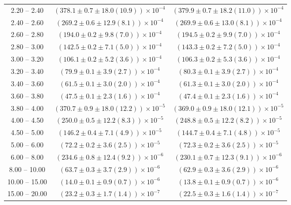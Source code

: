 \begin{table}
\begin{center}
\begin{tabular}{ c | c c }
2.20 -- 2.40 & $(378.1\pm0.7\pm18.0(10.9))\times10^{-4}$ & $(379.9\pm0.7\pm18.2(11.0))\times10^{-4}$ \\ 
2.40 -- 2.60 & $(269.2\pm0.6\pm12.9(8.1))\times10^{-4}$ & $(269.9\pm0.6\pm13.0(8.1))\times10^{-4}$ \\ 
2.60 -- 2.80 & $(194.0\pm0.2\pm9.8(7.0))\times10^{-4}$ & $(194.5\pm0.2\pm9.9(7.0))\times10^{-4}$ \\ 
2.80 -- 3.00 & $(142.5\pm0.2\pm7.1(5.0))\times10^{-4}$ & $(143.3\pm0.2\pm7.2(5.0))\times10^{-4}$ \\ 
3.00 -- 3.20 & $(106.1\pm0.2\pm5.2(3.6))\times10^{-4}$ & $(106.3\pm0.2\pm5.3(3.6))\times10^{-4}$ \\ 
3.20 -- 3.40 & $(79.9\pm0.1\pm3.9(2.7))\times10^{-4}$ & $(80.3\pm0.1\pm3.9(2.7))\times10^{-4}$ \\ 
3.40 -- 3.60 & $(61.5\pm0.1\pm3.0(2.0))\times10^{-4}$ & $(61.3\pm0.1\pm3.0(2.0))\times10^{-4}$ \\ 
3.60 -- 3.80 & $(47.5\pm0.1\pm2.3(1.6))\times10^{-4}$ & $(47.4\pm0.1\pm2.3(1.6))\times10^{-4}$ \\ 
3.80 -- 4.00 & $(370.7\pm0.9\pm18.0(12.2))\times10^{-5}$ & $(369.0\pm0.9\pm18.0(12.1))\times10^{-5}$ \\ 
4.00 -- 4.50 & $(250.0\pm0.5\pm12.2(8.3))\times10^{-5}$ & $(248.8\pm0.5\pm12.2(8.2))\times10^{-5}$ \\ 
4.50 -- 5.00 & $(146.2\pm0.4\pm7.1(4.9))\times10^{-5}$ & $(144.7\pm0.4\pm7.1(4.8))\times10^{-5}$ \\ 
5.00 -- 6.00 & $(72.2\pm0.2\pm3.6(2.5))\times10^{-5}$ & $(72.3\pm0.2\pm3.6(2.5))\times10^{-5}$ \\ 
6.00 -- 8.00 & $(234.6\pm0.8\pm12.4(9.2))\times10^{-6}$ & $(230.1\pm0.7\pm12.3(9.1))\times10^{-6}$ \\ 
8.00 -- 10.00 & $(63.7\pm0.3\pm3.7(2.9))\times10^{-6}$ & $(62.9\pm0.3\pm3.6(2.9))\times10^{-6}$ \\ 
10.00 -- 15.00 & $(14.0\pm0.1\pm0.9(0.7))\times10^{-6}$ & $(13.8\pm0.1\pm0.9(0.7))\times10^{-6}$ \\ 
15.00 -- 20.00 & $(23.2\pm0.3\pm1.7(1.4))\times10^{-7}$ & $(22.5\pm0.3\pm1.6(1.4))\times10^{-7}$ \\ 
\hline
\end{tabular}
\end{center}
\end{table}
 
